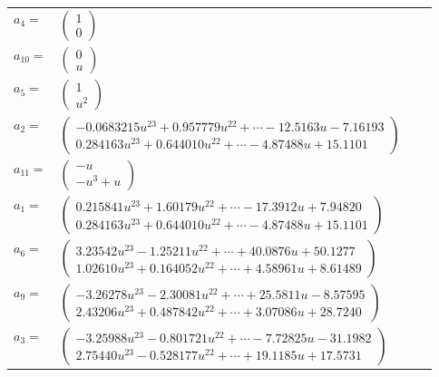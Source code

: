 \documentclass[1p]{elsarticle_modified}
\theoremstyle{definition}
\begin{document}
\begin{tabular}{m{7pt} m{180pt} m{7pt} m{180pt} }
\flushright $a_{4}=$&$\begin{pmatrix}1\\0\end{pmatrix}$ \\
\flushright $a_{10}=$&$\begin{pmatrix}0\\u\end{pmatrix}$ \\
\flushright $a_{5}=$&$\begin{pmatrix}1\\u^2\end{pmatrix}$ \\
\flushright $a_{2}=$&$\begin{pmatrix}-0.0683215 u^{23}+0.957779 u^{22}+\cdots-12.5163 u-7.16193\\0.284163 u^{23}+0.644010 u^{22}+\cdots-4.87488 u+15.1101\end{pmatrix}$ \\
\flushright $a_{11}=$&$\begin{pmatrix}- u\\- u^3+u\end{pmatrix}$ \\
\flushright $a_{1}=$&$\begin{pmatrix}0.215841 u^{23}+1.60179 u^{22}+\cdots-17.3912 u+7.94820\\0.284163 u^{23}+0.644010 u^{22}+\cdots-4.87488 u+15.1101\end{pmatrix}$ \\
\flushright $a_{6}=$&$\begin{pmatrix}3.23542 u^{23}-1.25211 u^{22}+\cdots+40.0876 u+50.1277\\1.02610 u^{23}+0.164052 u^{22}+\cdots+4.58961 u+8.61489\end{pmatrix}$ \\
\flushright $a_{9}=$&$\begin{pmatrix}-3.26278 u^{23}-2.30081 u^{22}+\cdots+25.5811 u-8.57595\\2.43206 u^{23}+0.487842 u^{22}+\cdots+3.07086 u+28.7240\end{pmatrix}$ \\
\flushright $a_{3}=$&$\begin{pmatrix}-3.25988 u^{23}-0.801721 u^{22}+\cdots-7.72825 u-31.1982\\2.75440 u^{23}-0.528177 u^{22}+\cdots+19.1185 u+17.5731\end{pmatrix}$ \\

\end{tabular}
\end{document}
